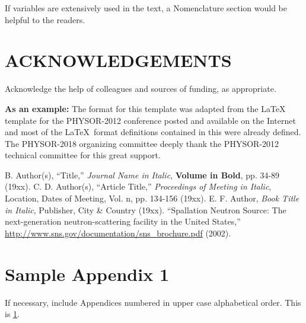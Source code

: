\documentclass[letterpaper]{physor2018}
\begin{document}
If variables are extensively used in the text, a Nomenclature section would be helpful to the readers.

\section*{ACKNOWLEDGEMENTS}

Acknowledge the help of colleagues and sources of funding, as appropriate.

\textbf{As an example:} The format for this template was adapted from the \LaTeX 
template for the PHYSOR-2012 conference posted and available on the Internet and 
most of the \LaTeX\ format definitions contained in this were already defined. The 
PHYSOR-2018 organizing committee deeply thank the PHYSOR-2012 technical committee 
for this great support.

% 
% 

\setlength{\baselineskip}{12pt}
\begin{thebibliography}{300}
 B. Author(s), ``Title,'' \emph{Journal Name in Italic}, 
  \textbf{Volume in Bold}, pp. 34-89 (19xx).
 C. D. Author(s), ``Article Title,'' \emph{Proceedings of
  Meeting in Italic}, Location, Dates of Meeting, Vol. n, pp. 134-156 
  (19xx).
 E. F. Author, \emph{Book Title in Italic}, Publisher, City \&
  Country (19xx). 
 ``Spallation Neutron Source: The next-generation 
  neutron-scattering facility in the United States,'' 
  \url{http://www.sns.gov/documentation/sns\_brochure.pdf} (2002).
\end{thebibliography}

\appendix
\gdef\thesection{APPENDIX \Alph{section}}
\section{Sample Appendix 1}
\label{app:a}
If necessary, include Appendices numbered in upper case alphabetical order. This is \ref{app:a}. 
\end{document}
